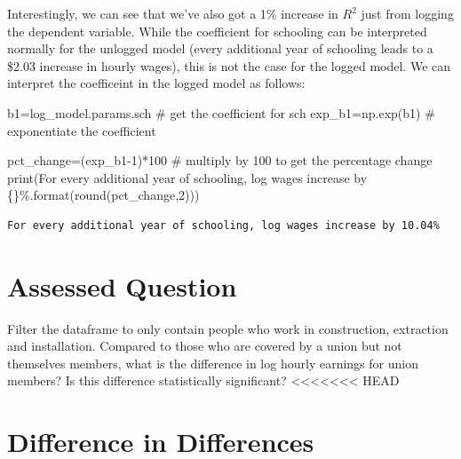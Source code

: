 \documentclass[
  letterpaper,
  DIV=11,
  numbers=noendperiod]{scrreprt}
\newenvironment{Shaded}{\begin{snugshade}}{\end{snugshade}}
\newcommand{\BuiltInTok}[1]{\textcolor[rgb]{0.00,0.23,0.31}{#1}}
\newcommand{\CommentTok}[1]{\textcolor[rgb]{0.37,0.37,0.37}{#1}}
\newcommand{\DecValTok}[1]{\textcolor[rgb]{0.68,0.00,0.00}{#1}}
\newcommand{\NormalTok}[1]{\textcolor[rgb]{0.00,0.23,0.31}{#1}}
\newcommand{\OperatorTok}[1]{\textcolor[rgb]{0.37,0.37,0.37}{#1}}
\newcommand{\SpecialCharTok}[1]{\textcolor[rgb]{0.37,0.37,0.37}{#1}}
\newcommand{\StringTok}[1]{\textcolor[rgb]{0.13,0.47,0.30}{#1}}
\begin{document}
Interestingly, we can see that we've also got a 1\% increase in \(R^2\)
just from logging the dependent variable. While the coefficient for
schooling can be interpreted normally for the unlogged model (every
additional year of schooling leads to a \$2.03 increase in hourly
wages), this is not the case for the logged model. We can interpret the
coefficeint in the logged model as follows:

\begin{Shaded}
\begin{Highlighting}[]
\NormalTok{b1}\OperatorTok{=}\NormalTok{log\_model.params.sch }\CommentTok{\# get the coefficient for sch}
\NormalTok{exp\_b1}\OperatorTok{=}\NormalTok{np.exp(b1) }\CommentTok{\# exponentiate the coefficient}

\NormalTok{pct\_change}\OperatorTok{=}\NormalTok{(exp\_b1}\OperatorTok{{-}}\DecValTok{1}\NormalTok{)}\OperatorTok{*}\DecValTok{100} \CommentTok{\# multiply by 100 to get the percentage change}
\BuiltInTok{print}\NormalTok{(}\StringTok{\textquotesingle{}For every additional year of schooling, log wages increase by }\SpecialCharTok{\{\}}\StringTok{\%\textquotesingle{}}\NormalTok{.}\BuiltInTok{format}\NormalTok{(}\BuiltInTok{round}\NormalTok{(pct\_change,}\DecValTok{2}\NormalTok{)))}
\end{Highlighting}
\end{Shaded}

\begin{verbatim}
For every additional year of schooling, log wages increase by 10.04%
\end{verbatim}


\hypertarget{assessed-question-6}{%
\chapter{Assessed Question}\label{assessed-question-6}}

Filter the dataframe to only contain people who work in construction,
extraction and installation. Compared to those who are covered by a
union but not themselves members, what is the difference in log hourly
earnings for union members? Is this difference statistically
significant?
<<<<<<< HEAD


\hypertarget{difference-in-differences}{%
\chapter{Difference in Differences}\label{difference-in-differences}}
\end{document}
